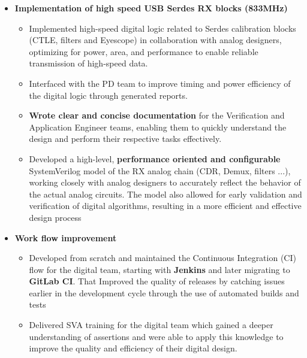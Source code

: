 \begin{cventries}
{\begin{cvitems}
\begin{itemize}
\begin{itemize}
            \item {\textbf{Setup and configured the C toolchain} in the simulation environment, enabling efficient and accurate testing and validation of designs.}
            \item {Effectively interfaced with external Design Verification (DV) contractors to ensure seamless integration of their deliverables into the project, resulting in successful project completion.}
          \end{itemize}
          \item {\textbf{Implementation of high speed USB Serdes RX blocks (833MHz)}}
          \begin{itemize}
            \item {Implemented high-speed digital logic related to Serdes calibration blocks (CTLE, filters and Eyescope) in collaboration with analog designers, optimizing for power, area, and performance to enable reliable transmission of high-speed data.}
            \item {Interfaced with the PD team to improve timing and power efficiency of the digital logic through generated reports.}
            \item {\textbf{Wrote clear and concise documentation} for the Verification and Application Engineer teams, enabling them to quickly understand the design and perform their respective tasks effectively.}
            \item {Developed a high-level, \textbf{performance oriented and configurable} SystemVerilog model of the RX analog chain (CDR, Demux, filters ...), working closely with analog designers to accurately reflect the behavior of the actual analog circuits. The model also allowed for early validation and verification of digital algorithms, resulting in a more efficient and effective design process}
          \end{itemize}
          \item {\textbf{Work flow improvement}}
          \begin{itemize}
            \item {Developed from scratch and maintained the Continuous Integration (CI) flow for the digital team, starting with \textbf{Jenkins} and later migrating to \textbf{GitLab CI}. That Improved the quality of releases by catching issues earlier in the development cycle through the use of automated builds and tests}
            \item {Delivered SVA training for the digital team which gained a deeper understanding of assertions and were able to apply this knowledge to improve the quality and efficiency of their digital design.}

\end{itemize}
\end{itemize}
\end{cvitems}}
\end{cventries}
